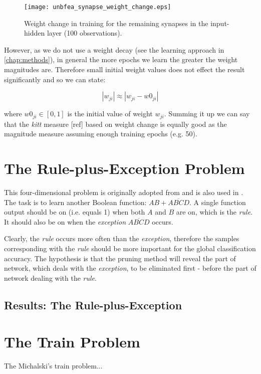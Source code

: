\begin{figure}[H]
\centering
\texttt{[image: unbfea\_synapse\_weight\_change.eps]}
\caption{Weight change in training for the remaining synapses in the input-hidden layer (100 observations).}
\label{fig:examples:unbfea_synapse_weight_change}
\end{figure}

However, as we do not use a weight decay (see the learning approach in \cref{chap:methods}), in general the more epochs we learn the greater the weight magnitudes are. Therefore small initial weight values does not effect the result significantly and so we can state:

\begin{equation}
|w_{ji}| \approx |w_{ji} - w0_{ji}|
\end{equation}

where $ w0_{ji} \in [0, 1] $ is the initial value of weight $ w_{ji} $. Summing it up we can say that the \textit{kitt} measure [ref] based on weight change is equally good as the magnitude measure assuming enough training epochs (e.g. 50).

\section{The Rule-plus-Exception Problem} \label{sec:dataset_rpe}
This four-dimensional problem is originally adopted from \citep{mozer_smolensky} and is also used in \citep{karnin}. The task is to learn another Boolean function: $ AB+\overline{ABCD} $. A single function output should be on (i.e. equals 1) when both $ A $ and $ B $ are on, which is the \textit{rule}. It should also be on when the \textit{exception} $ \overline{ABCD} $ occurs.

Clearly, the \textit{rule} occurs more often than the \textit{exception}, therefore the samples corresponding with the \textit{rule} should be more important for the global classification accuracy. The hypothesis is that the pruning method will reveal the part of network, which deals with the \textit{exception}, to be eliminated first - before the part of network dealing with the \textit{rule}.

\subsection*{Results: The Rule-plus-Exception}

\section{The Train Problem} \label{sec:dataset_train}
The Michalski's train problem...

